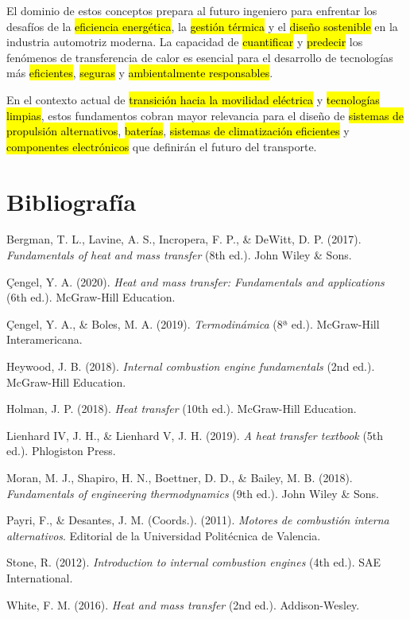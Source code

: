 \documentclass{article}
\begin{document}
    El dominio de estos conceptos prepara al futuro ingeniero para enfrentar los desafíos de la \hl{eficiencia energética}, la \hl{gestión térmica} y el \hl{diseño sostenible} en la industria automotriz moderna. La capacidad de \hl{cuantificar} y \hl{predecir} los fenómenos de transferencia de calor es esencial para el desarrollo de tecnologías más \hl{eficientes}, \hl{seguras} y \hl{ambientalmente responsables}.

    En el contexto actual de \hl{transición hacia la movilidad eléctrica} y \hl{tecnologías limpias}, estos fundamentos cobran mayor relevancia para el diseño de \hl{sistemas de propulsión alternativos}, \hl{baterías}, \hl{sistemas de climatización eficientes} y \hl{componentes electrónicos} que definirán el futuro del transporte.

    \section{Bibliografía}

    Bergman, T. L., Lavine, A. S., Incropera, F. P., \& DeWitt, D. P. (2017). \emph{Fundamentals of heat and mass transfer} (8th ed.). John Wiley \& Sons.

    Çengel, Y. A. (2020). \emph{Heat and mass transfer: Fundamentals and applications} (6th ed.). McGraw-Hill Education.

    Çengel, Y. A., \& Boles, M. A. (2019). \emph{Termodinámica} (8ª ed.). McGraw-Hill Interamericana.

    Heywood, J. B. (2018). \emph{Internal combustion engine fundamentals} (2nd ed.). McGraw-Hill Education.

    Holman, J. P. (2018). \emph{Heat transfer} (10th ed.). McGraw-Hill Education.

    Lienhard IV, J. H., \& Lienhard V, J. H. (2019). \emph{A heat transfer textbook} (5th ed.). Phlogiston Press.

    Moran, M. J., Shapiro, H. N., Boettner, D. D., \& Bailey, M. B. (2018). \emph{Fundamentals of engineering thermodynamics} (9th ed.). John Wiley \& Sons.

    Payri, F., \& Desantes, J. M. (Coords.). (2011). \emph{Motores de combustión interna alternativos}. Editorial de la Universidad Politécnica de Valencia.

    Stone, R. (2012). \emph{Introduction to internal combustion engines} (4th ed.). SAE International.

    White, F. M. (2016). \emph{Heat and mass transfer} (2nd ed.). Addison-Wesley.
\end{document}
